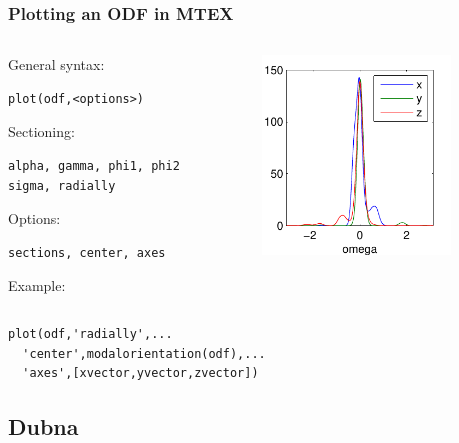 \documentclass{beamer}
\newcommand{\MTEX}{{\bf {\color{red}M}TEX\,}}%
\begin{document}
\begin{frame}[fragile]
  \frametitle{Plotting  an ODF in \MTEX}

  \begin{columns}
    \begin{column}{6.5cm}
      General syntax:
\begin{lstlisting}
plot(odf,<options>)
\end{lstlisting}
      
      Sectioning:
\begin{lstlisting}
alpha, gamma, phi1, phi2
sigma, radially
\end{lstlisting}
      
      Options:
\begin{lstlisting}
sections, center, axes
\end{lstlisting}

      Example:      
    \end{column}
    \begin{column}{5cm}
      \includegraphics[width=5cm]{pic/radialplot}
    \end{column}
  \end{columns}

\begin{lstlisting}
plot(odf,'radially',...
  'center',modalorientation(odf),...
  'axes',[xvector,yvector,zvector])
\end{lstlisting}


\end{frame}


\subsection*{Dubna}
\end{document}
